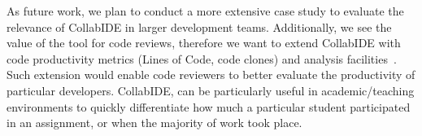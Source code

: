 As future work, we plan to conduct a more extensive case study to evaluate the relevance of CollabIDE 
in larger development teams. Additionally, we see the value of the tool for code reviews, therefore we 
want to extend CollabIDE with code productivity metrics (\eg Lines of Code, code clones) and analysis 
facilities~\cite{lienhard12}. Such extension would enable code reviewers to better evaluate the 
productivity of particular developers. CollabIDE, can be particularly useful in academic/teaching 
environments to quickly differentiate how much a particular student participated in an assignment, or 
when the majority of work took place.


\endinput
